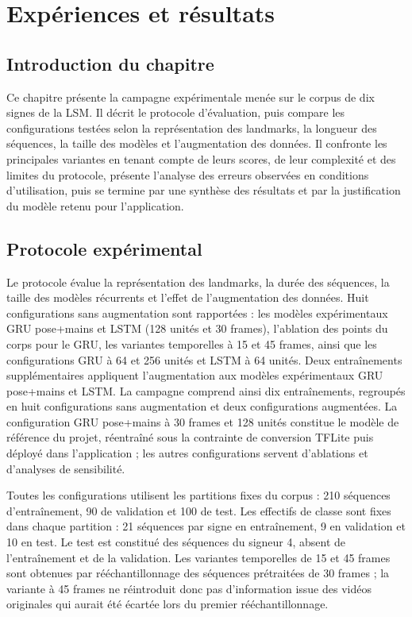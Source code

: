 \chapter{Expériences et résultats}

\section{Introduction du chapitre}

Ce chapitre présente la campagne expérimentale menée sur le corpus de dix signes de la LSM. Il décrit le protocole d'évaluation, puis compare les configurations testées selon la représentation des landmarks, la longueur des séquences, la taille des modèles et l'augmentation des données. Il confronte les principales variantes en tenant compte de leurs scores, de leur complexité et des limites du protocole, présente l'analyse des erreurs observées en conditions d'utilisation, puis se termine par une synthèse des résultats et par la justification du modèle retenu pour l'application.

\section{Protocole expérimental}

Le protocole évalue la représentation des landmarks, la durée des séquences, la taille des modèles récurrents et l'effet de l'augmentation des données. Huit configurations sans augmentation sont rapportées : les modèles expérimentaux GRU pose+mains et LSTM (128 unités et 30 frames), l'ablation des points du corps pour le GRU, les variantes temporelles à 15 et 45 frames, ainsi que les configurations GRU à 64 et 256 unités et LSTM à 64 unités. Deux entraînements supplémentaires appliquent l'augmentation aux modèles expérimentaux GRU pose+mains et LSTM. La campagne comprend ainsi dix entraînements, regroupés en huit configurations sans augmentation et deux configurations augmentées. La configuration GRU pose+mains à 30 frames et 128 unités constitue le modèle de référence du projet, réentraîné sous la contrainte de conversion TFLite puis déployé dans l'application ; les autres configurations servent d'ablations et d'analyses de sensibilité.

Toutes les configurations utilisent les partitions fixes du corpus : 210 séquences d'entraînement, 90 de validation et 100 de test. Les effectifs de classe sont fixes dans chaque partition : 21 séquences par signe en entraînement, 9 en validation et 10 en test. Le test est constitué des séquences du signeur 4, absent de l'entraînement et de la validation. Les variantes temporelles de 15 et 45 frames sont obtenues par rééchantillonnage des séquences prétraitées de 30 frames ; la variante à 45 frames ne réintroduit donc pas d'information issue des vidéos originales qui aurait été écartée lors du premier rééchantillonnage.

